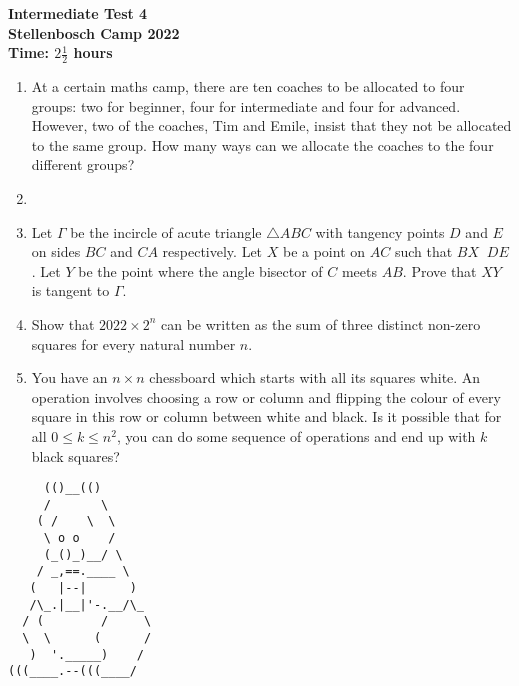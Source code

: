 \documentclass{article}
\begin{document}
\thispagestyle{empty}

\begin{center}
  \textbf{\Large Intermediate Test 4}
  \\ \vspace{1em}
  \textbf{\large Stellenbosch Camp 2022}
  \\ \vspace{1em}
  \textbf{\large Time: $2\frac{1}{2}$ hours}
\end{center}

\bigskip

\begin{enumerate}[itemsep=\fill]

\item %
At a certain maths camp, there are ten coaches to be allocated to four groups: two for beginner, four for intermediate and four for advanced. However, two of the coaches, Tim and Emile, insist that they not be allocated to the same group. How many ways can we allocate the coaches to the four different groups?

\item %


\item %
Let $\Gamma$ be the incircle of acute triangle $\triangle ABC$ with tangency points $D$ and $E$ on sides $BC$ and $CA$ respectively. Let $X$ be a point on $AC$ such that $BX\mathop{||}DE$. Let $Y$ be the point where the angle bisector of $C$ meets $AB$. Prove that $XY$ is tangent to $\Gamma$.

\item %
Show that $2022 \times 2^n$ can be written as the sum of three distinct non-zero squares for every natural number $n$.


\item %
You have an $n \times n$ chessboard which starts with all its squares white.
An operation involves choosing a row or column and flipping the colour of every square in this row or column between white and black.
Is it possible that for all $0 \leq k \leq n^2$, you can do some sequence of operations and end up with $k$ black squares?

\end{enumerate}


\vfill
\centering
\small
\begin{BVerbatim}
     (()__(()
     /       \ 
    ( /    \  \
     \ o o    /
     (_()_)__/ \             
    / _,==.____ \
   (   |--|      )
   /\_.|__|'-.__/\_
  / (        /     \ 
  \  \      (      /
   )  '._____)    /    
(((____.--(((____/
\end{BVerbatim}
\end{document}
